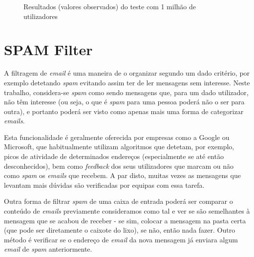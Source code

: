 \documentclass[a4paper,11pt,openright,oneside]{report}
\begin{document}
\begin{figure}[ht]
\center
{}
\caption{Resultados (valores observados) do teste com 1 milhão de utilizadores}
\label{fig:test1mo}
\end{figure}

\chapter{SPAM Filter}
\label{chap.spamfilter}

A filtragem de \textit{email} é uma maneira de o organizar segundo um dado critério, por exemplo detetando \textit{spam} evitando assim ter de ler mensagens sem interesse. Neste trabalho, considera-se \textit{spam} como sendo mensagens que, para um dado utilizador, não têm interesse (ou seja, o que é \textit{spam} para uma pessoa poderá não o ser para outra), e portanto poderá ser visto como apenas mais uma forma de categorizar \textit{emails}.

Esta funcionalidade é geralmente oferecida por empresas como a Google ou Microsoft, que habitualmente utilizam algoritmos que detetam, por exemplo, picos de atividade de determinados endereços (especialmente se até então desconhecidos), bem como \textit{feedback} dos seus utilizadores que marcam ou não como \textit{spam} os \textit{emails} que recebem. A par disto, muitas vezes as mensagens que levantam mais dúvidas são verificadas por equipas com essa tarefa.

Outra forma de filtrar \textit{spam} de uma caixa de entrada poderá ser comparar o conteúdo de \textit{emails} previamente consideramos como tal e ver se são semelhantes à mensagem que se acabou de receber - se sim, colocar a mensagem na pasta certa (que pode ser diretamente o caixote do lixo), se não, então nada fazer. Outro método é verificar se o endereço de \textit{email} da nova mensagem já enviara algum \textit{email} de \textit{spam} anteriormente.
\end{document}

